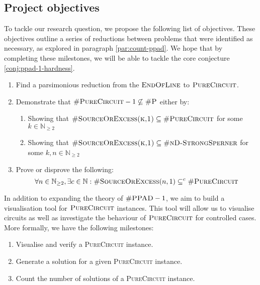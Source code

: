 \subsection{Project objectives}

To tackle our research question, we propose the following list of objectives. 
These objectives outline a series of reductions between problems that were identified as necessary,
as explored in paragraph \ref{par:count-ppad}.
We hope that by completing these milestones, we will be able to tackle the core conjecture \ref{conj:ppad-1-hardness}.

\begin{enumerate}[label*=R.\arabic*)]
    \item Find a parsimonious reduction from the $\textsc{EndOfLine}$ to $\textsc{PureCircuit}$.
    \item Demonstrate that $\textsc{\#PureCircuit}- 1 \not\subseteq \textsc{\#P}$ either by:
        \begin{enumerate}
            \item Showing that $\textsc{\#SourceOrExcess(k,1)} \subseteq \textsc{\#PureCircuit}$ for some $k \in \mathbb{N}_{\geq 2}$
            \item Showing that $\textsc{\#SourceOrExcess(k,1)} \subseteq \textsc{\#nD-StrongSperner}$ for some $k,n \in \mathbb{N}_{\geq 2}$ 
        \end{enumerate}
    \item Prove or disprove the following:
\[
\forall n \in \mathbb{N}_{\geq 2}, \exists c \in \mathbb{N}:  \textnormal{\textsc{\#SourceOrExcess}}(n, 1) \subseteq^c \textnormal{\textsc{\#PureCircuit}}
\]

\end{enumerate}

In addition to expanding the theory of $\textsc{\#PPAD} -1$, we aim to build
a visualisation tool for $\textsc{PureCircuit}$ instances. This tool
will allow us to visualise circuits as well as investigate the behaviour
of $\textsc{PureCircuit}$ for controlled cases. More formally,
we have the following milestones:

\begin{enumerate}[label=S.\arabic*)]
    \item Visualise and verify a \textsc{PureCircuit} instance.
    \item Generate a solution for a given \textsc{PureCircuit} instance.
    \item Count the number of solutions of a \textsc{PureCircuit} instance.
\end{enumerate}


